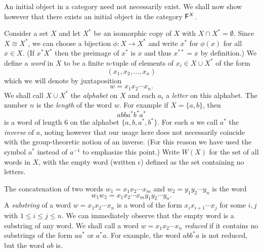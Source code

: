 \begin{sectionthm}
    An initial object in a category need not necessarily exist. We shall now
    show however that there exists an initial object in the category
    \(\mathsf{F}^X\). 
    
    Consider a set \(X\) and let \(X^*\) be an isomorphic copy of \(X\) with \(X
    \cap X^* = \emptyset\). Since \(X \cong X^*\), we can choose a bijection
    \(\phi : X \to X^*\) and write \(x^*\) for \(\phi(x)\) for all \(x \in X\).
    (If \(x^* X^*\) then the preimage of \(x^*\) is \(x\) and thus \(x^{**} =
    x\) by definition.) We define a \emph{word} in \(X\) to be a finite
    \(n\)-tuple of elements of \(x_i \in X \cup X^*\) of the form
    \[
        (x_1, x_2, \ldots, x_n)
    \]
    which we will denote by juxtaposition
    \[
        w = x_1 x_2 \cdots x_n.
    \]
    We shall call \(X \cup X^*\) the \emph{alphabet} on \(X\) and each \(a_i\) a
    \emph{letter} on this alphabet. The number \(n\) is the \emph{length} of the
    word \(w\). For example if \(X = \{a, b\}\), then
    \[
        abba^*b^*a^*
    \]
    is a word of length \(6\) on the alphabet \(\{a, b, a^*, b^*\}\). For each
    \(a\) we call \(a^*\) the \emph{inverse} of \(a\), noting however that our
    usage here does not necessarily coincide with the group-theoretic notion of
    an inverse. (For this reason we have used the symbol \(a^*\) instead of
    \(a^{-1}\) to emphasize this point.) Write \(W(X)\) for the set of all words
    in \(X\), with the empty word (written \(\epsilon\)) defined as the set
    containing no letters.

    The concatenation of two words \(w_1 = x_1 x_2 \cdots x_m\) and \(w_2 = y_1
    y_2 \cdots y_n\) is the word
    \[
        w_1 w_2 = x_1 x_2 \cdots x_m y_1 y_2 \cdots y_n.
    \]
    A \emph{substring} of a word \(w = x_1 x_2 \cdots x_n\) is a word of the
    form \(x_i x_{i + 1} \cdots x_j\) for some \(i, j\) with \(1 \leq i \leq j
    \leq n\). We can immediately observe that the empty word is a substring of
    any word. We shall call a word \(w = x_1 x_2 \cdots x_n\) \emph{reduced} if
    it contains no substrings of the form \(aa^*\) or \(a^*a\). For example, the
    word \(abb^*a\) is not reduced, but the word \(ab\) is.
\end{sectionthm}


